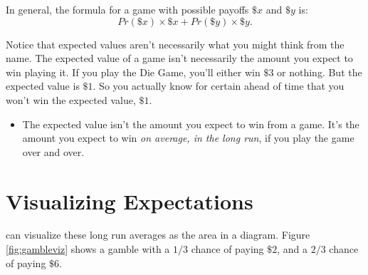 \documentclass[justified]{tufte-book}
\newcommand{\p}{Pr}
\newenvironment{warning}{\begin{itemize}\item[\faBan]}{\end{itemize}}
\theoremstyle{definition}
\theoremstyle{definition}
\theoremstyle{definition}
\theoremstyle{remark}
\begin{document}
In general, the formula for a game with possible payoffs \(\$x\) and
\(\$y\) is: \[ \p(\$x) \times \$x + \p(\$y) \times \$y. \]

Notice that expected values aren't necessarily what you might think from
the name. The expected value of a game isn't necessarily the amount you
expect to win playing it. If you play the Die Game, you'll either win
\(\$3\) or nothing. But the expected value is \(\$1\). So you actually
know for certain ahead of time that you won't win the expected value,
\(\$1\).

\begin{warning}
The expected value isn't the amount you expect to win from a game. It's
the amount you expect to win \emph{on average, in the long run}, if you
play the game over and over.
\end{warning}

\hypertarget{visualizing-expectations}{%
\section{Visualizing Expectations}\label{visualizing-expectations}}

 can visualize these long run averages as the area in a
diagram. Figure \ref{fig:gambleviz} shows a gamble with a \(1/3\) chance
of paying \(\$2\), and a \(2/3\) chance of paying \(\$6\).
\end{document}
